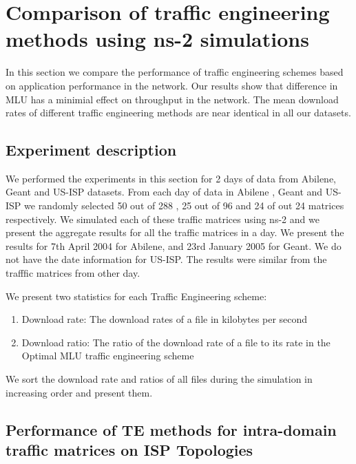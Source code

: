 \section{Comparison of traffic engineering methods using ns-2 simulations}

In this section we compare the performance of traffic engineering schemes based on application performance in the network. Our results show that difference in MLU has a minimial effect on throughput in the network. The mean download rates of different traffic engineering methods are near identical in all our datasets.

\subsection{Experiment description}
We performed the experiments in this section for 2 days of data from Abilene, Geant and US-ISP datasets.
From each day of data in Abilene , Geant and US-ISP we randomly selected 50 out of 288 , 25 out of 96 and 24 of out 24 matrices respectively. We simulated each of these traffic matrices using ns-2 and we present the aggregate results for all the traffic matrices in a day. We present the results  for 7th April 2004 for Abilene, and 23rd January 2005 for Geant. We do not have the date information for US-ISP.  The results were similar from the trafffic matrices from other day. 

We present two statistics for each Traffic Engineering scheme:
\begin{enumerate}
\item Download rate: The download rates of a file in kilobytes per second
\item Download ratio: The ratio of the download rate of a file to its rate in the Optimal MLU traffic engineering scheme
\end{enumerate}
We sort the download rate and ratios of all files during the simulation in increasing order and present them.

\subsection{Performance of TE methods for intra-domain traffic matrices on ISP Topologies}

